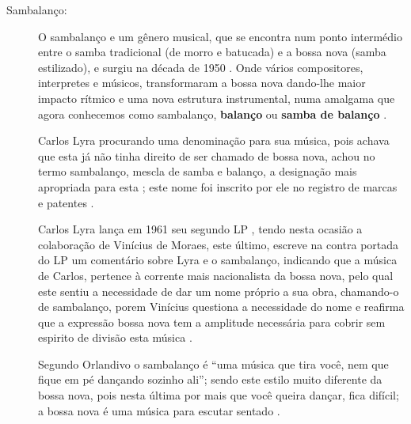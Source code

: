 \begin{description}

\item[Sambalanço:]
O sambalanço e um gênero musical,
que se encontra num ponto intermédio entre o samba tradicional (de morro e batucada)
e a bossa nova (samba estilizado), e surgiu na década de 1950 \cite[pp. 119]{diniz2008almanaque}.
Onde vários compositores, interpretes e músicos, 
transformaram a bossa nova dando-lhe maior impacto rítmico e uma nova estrutura instrumental,
numa amalgama que agora conhecemos como sambalanço, \textbf{balanço} ou \textbf{samba de balanço} \cite{de2017sambalanco}.

Carlos Lyra procurando uma denominação para sua música, 
pois achava que esta já não tinha direito de ser chamado de bossa nova,
achou no termo sambalanço, mescla de samba e balanço, a designação mais apropriada para esta \cite{castro2011bossa};
este nome foi inscrito por ele no registro de marcas e patentes \cite[pp. 127]{vianna1999bezerra} \cite{castro2011bossa}.


Carlos Lyra lança em 1961  seu segundo LP \cite[pp. 142]{lyrasongbook}  \cite{castro2011bossa}, 
tendo nesta ocasião a colaboração de Vinícius de Moraes,
este último, escreve na contra portada do LP um comentário sobre Lyra e o sambalanço,
indicando que a música de Carlos, pertence à corrente mais nacionalista da bossa nova,
pelo qual este sentiu a necessidade de dar um nome próprio a sua obra, 
chamando-o de sambalanço, 
porem Vinícius questiona a necessidade do nome e reafirma que a expressão 
 bossa nova tem a amplitude necessária para cobrir sem espirito de divisão esta música \cite{castro2011bossa}.

Segundo Orlandivo o sambalanço é ``uma música que tira você, nem que fique em pé dançando sozinho ali'';
sendo este estilo muito diferente da bossa nova, pois nesta última por mais que você queira dançar, fica difícil;
a bossa nova é uma música para escutar sentado \cite{de2017sambalanco}.
\begin{example} ~


\end{example}
\end{description}
